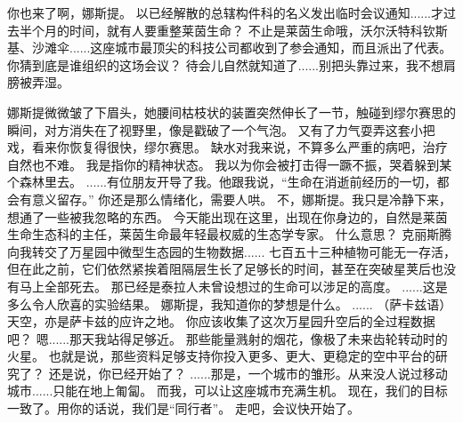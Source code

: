 \documentclass[openany]{book}
\begin{document}
\begin{dialogue}
     你也来了啊，娜斯提。
     以已经解散的总辖构件科的名义发出临时会议通知......才过去半个月的时间，就有人要重整莱茵生命？
     不止是莱茵生命哦，沃尔沃特科钦斯基、沙滩伞......这座城市最顶尖的科技公司都收到了参会通知，而且派出了代表。
     你猜到底是谁组织的这场会议？
     待会儿自然就知道了......别把头靠过来，我不想肩膀被弄湿。\par
    娜斯提微微皱了下眉头，她腰间枯枝状的装置突然伸长了一节，触碰到缪尔赛思的瞬间，对方消失在了视野里，像是戳破了一个气泡。
     又有了力气耍弄这套小把戏，看来你恢复得很快，缪尔赛思。
     缺水对我来说，不算多么严重的病吧，治疗自然也不难。
     我是指你的精神状态。
     我以为你会被打击得一蹶不振，哭着躲到某个森林里去。
     ......有位朋友开导了我。他跟我说，“生命在消逝前经历的一切，都会有意义留存。”
     你还是那么情绪化，需要人哄。
     不，娜斯提。我只是冷静下来，想通了一些被我忽略的东西。
     今天能出现在这里，出现在你身边的，自然是莱茵生命生态科的主任，莱茵生命最年轻最权威的生态学专家。
     什么意思？
     克丽斯腾向我转交了万星园中微型生态园的生物数据......
     七百五十三种植物可能无一存活，但在此之前，它们依然紧挨着阻隔层生长了足够长的时间，甚至在突破星荚后也没有马上全部死去。
     那已经是泰拉人未曾设想过的生命可以涉足的高度。
     ......这是多么令人欣喜的实验结果。
     娜斯提，我知道你的梦想是什么。
     ......
     （萨卡兹语）天空，亦是萨卡兹的应许之地。
     你应该收集了这次万星园升空后的全过程数据吧？
     嗯......那天我站得足够近。
     那些能量溅射的烟花，像极了未来齿轮转动时的火星。
     也就是说，那些资料足够支持你投入更多、更大、更稳定的空中平台的研究了？
     还是说，你已经开始了？
     ......那是，一个城市的雏形。从来没人说过移动城市......只能在地上匍匐。
     而我，可以让这座城市充满生机。
     现在，我们的目标一致了。用你的话说，我们是“同行者”。
     走吧，会议快开始了。
\end{dialogue}
\end{document}
